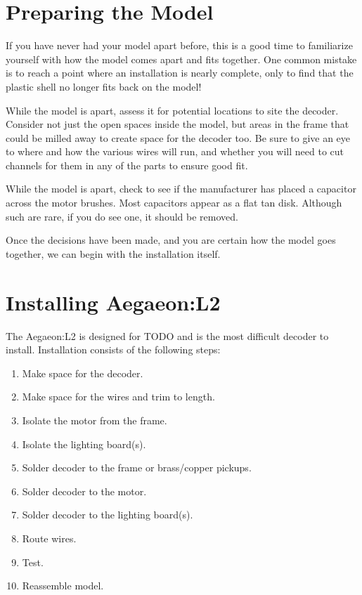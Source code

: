 \documentclass[12pt,letterpaper,draft]{memoir} %
\begin{document}
\section{Preparing the Model}

If you have never had your model apart before, this is a good time to familiarize yourself with how the model comes apart and fits together. One common mistake is to reach a point where an installation is nearly complete, only to find that the plastic shell no longer fits back on the model!

While the model is apart, assess it for potential locations to site the decoder. Consider not just the open spaces inside the model, but areas in the frame that could be milled away to create space for the decoder too. Be sure to give an eye to where and how the various wires will run, and whether you will need to cut channels for them in any of the parts to ensure good fit.

While the model is apart, check to see if the manufacturer has placed a capacitor across the motor brushes. Most capacitors appear as a flat tan disk. Although such are rare, if you do see one, it should be removed.

Once the decisions have been made, and you are certain how the model goes together, we can begin with the installation itself.

\section{Installing Aegaeon:L2}


The Aegaeon:L2 is designed for TODO and is the most difficult decoder to install. Installation consists of the following steps:
\begin{enumerate}
\item Make space for the decoder.
\item Make space for the wires and trim to length.
\item Isolate the motor from the frame.
\item Isolate the lighting board(s).
\item Solder decoder to the frame or brass/copper pickups.
\item Solder decoder to the motor.
\item Solder decoder to the lighting board(s).
\item Route wires.
\item Test.
\item Reassemble model.
\end{enumerate}
\end{document}
